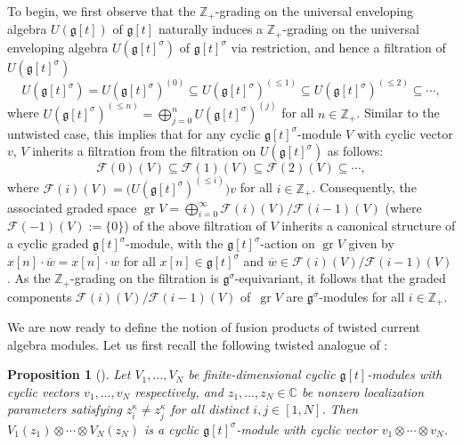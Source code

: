 \documentclass[pdftex]{sigma}
\numberwithin{equation}{section}
\newtheorem{Proposition}[Theorem]{Proposition}
 { \theoremstyle{definition}
\newtheorem{Definition}[Theorem]{Definition}
\newtheorem{Note}[Theorem]{Note}
\newtheorem{Example}[Theorem]{Example}
\newtheorem{Remark}[Theorem]{Remark} }
\DeclareMathOperator{\gr}{gr}
\begin{document}
To begin, we first observe that the $\mathbb{Z}_+$-grading on the universal enveloping algebra $U(\mathfrak{g}[t])$ of $\mathfrak{g}[t]$ naturally induces a $\mathbb{Z}_+$-grading on the universal enveloping algebra $U(\mathfrak{g}[t]^{\sigma})$ of $\mathfrak{g}[t]^{\sigma}$ via restriction, and hence a filtration of $U(\mathfrak{g}[t]^{\sigma})$
\begin{equation*}
U(\mathfrak{g}[t]^{\sigma})= U(\mathfrak{g}[t]^{\sigma})^{(0)}\subseteq U(\mathfrak{g}[t]^{\sigma})^{(\leq 1)}\subseteq U(\mathfrak{g}[t]^{\sigma})^{(\leq 2)}\subseteq\cdots,
\end{equation*}
where $U(\mathfrak{g}[t]^{\sigma})^{(\leq n)}=\bigoplus_{j=0}^n U(\mathfrak{g}[t]^{\sigma})^{(j)}$ for all $n\in\mathbb{Z}_+$. Similar to the untwisted case, this implies that for any cyclic $\mathfrak{g}[t]^{\sigma}$-module $V$ with cyclic vector $v$, $V$ inherits a filtration from the filtration on $U(\mathfrak{g}[t]^{\sigma})$ as follows:
\[
\mathcal{F}(0)(V)\subseteq\mathcal{F}(1)(V)\subseteq\mathcal{F}(2)(V)\subseteq\cdots,
\]
where $\mathcal{F}(i)(V)=\bigl(U(\mathfrak{g}[t]^{\sigma})^{(\leq i)}\bigr)v$ for all $i\in\mathbb{Z}_+$. Consequently, the associated graded space $\gr V=\bigoplus_{i=0}^{\infty}\mathcal{F}(i)(V)/\mathcal{F}(i-1)(V)$ (where $\mathcal{F}(-1)(V):=\{0\}$) of the above filtration of $V$ inherits a canonical structure of a cyclic graded $\mathfrak{g}[t]^{\sigma}$-module, with the $\mathfrak{g}[t]^{\sigma}$-action on $\gr V$ given by~${x[n]\cdot\overline{w}=\overline{x[n]\cdot w}}$
for all $x[n]\in\mathfrak{g}[t]^{\sigma}$ and $\overline{w}\in \mathcal{F}(i)(V)/\mathcal{F}(i-1)(V)$. As the $\mathbb{Z}_+$-grading on the filtration is $\mathfrak{g}^{\sigma}$-equivariant, it follows that the graded components $\mathcal{F}(i)(V)/\mathcal{F}(i-1)(V)$ of~$\gr V$ are $\mathfrak{g}^{\sigma}$-modules for all $i\in\mathbb{Z}_+$.

We are now ready to define the notion of fusion products of twisted current algebra modules. Let us first recall the following twisted analogue of \cite[Proposition 1.4]{FL99}:

\begin{Proposition}[{\cite[Proposition 6.3]{KV16}}]\label{2.2}
Let $V_1,\dots,V_N$ be finite-dimensional cyclic $\mathfrak{g}[t]$-modules with cyclic vectors $v_1,\dots,v_N$ respectively, and $z_1,\dots, z_N\in\mathbb{C}$ be nonzero localization parameters satisfying $z_i^{\kappa}\neq z_j^{\kappa}$ for all distinct $i,j\in[1,N]$. Then $V_1(z_1)\otimes\cdots\otimes V_N(z_N)$ is a cyclic $\mathfrak{g}[t]^{\sigma}$-module with cyclic vector $v_1\otimes\cdots\otimes v_N$.
\end{Proposition}
\end{document}
